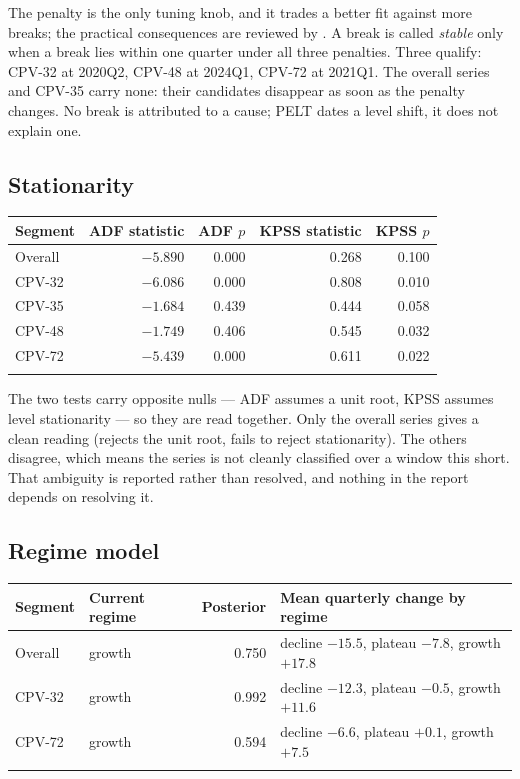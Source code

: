 The penalty is the only tuning knob, and it trades a better fit against more breaks; the practical consequences are reviewed by \citet{truong2020}. A break is called \emph{stable} only when a break lies within one quarter under all three penalties. Three
qualify: CPV-32 at 2020Q2, CPV-48 at 2024Q1, CPV-72 at 2021Q1. The overall series and CPV-35 carry none: their
candidates disappear as soon as the penalty changes. No break is attributed to a cause; PELT dates a level
shift, it does not explain one.

\subsection*{Stationarity}

\begin{longtable}[]{@{}lrrrr@{}}
\toprule\noalign{}
Segment & ADF statistic & ADF $p$ & KPSS statistic & KPSS $p$ \\
\midrule\noalign{}
\endhead
Overall & $-5.890$ & 0.000 & 0.268 & 0.100 \\
CPV-32 & $-6.086$ & 0.000 & 0.808 & 0.010 \\
CPV-35 & $-1.684$ & 0.439 & 0.444 & 0.058 \\
CPV-48 & $-1.749$ & 0.406 & 0.545 & 0.032 \\
CPV-72 & $-5.439$ & 0.000 & 0.611 & 0.022 \\
\bottomrule\noalign{}
\end{longtable}

The two tests carry opposite nulls --- ADF assumes a unit root, KPSS assumes level stationarity --- so they are
read together. Only the overall series gives a clean reading (rejects the unit root, fails to reject
stationarity). The others disagree, which means the series is not cleanly classified over a window this short.
That ambiguity is reported rather than resolved, and nothing in the report depends on resolving it.

\subsection*{Regime model}

\begin{longtable}[]{@{}llrl@{}}
\toprule\noalign{}
Segment & Current regime & Posterior & Mean quarterly change by regime \\
\midrule\noalign{}
\endhead
Overall & growth & 0.750 & decline $-15.5$, plateau $-7.8$, growth $+17.8$ \\
CPV-32 & growth & 0.992 & decline $-12.3$, plateau $-0.5$, growth $+11.6$ \\
CPV-72 & growth & 0.594 & decline $-6.6$, plateau $+0.1$, growth $+7.5$ \\
\bottomrule\noalign{}
\end{longtable}

